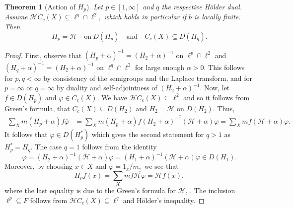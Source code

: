 \documentclass[10pt]{amsart}
\newtheorem{theorem}{Theorem}[section]
\theoremstyle{definition}
\newtheorem*{remark}{Remark}
\newcommand{\eat}[1]{}
\begin{document}
\begin{theorem}[Action of $ H_p$]\label{actionHp}
Let $p\in [1,\infty]$ and $q$ the respective H\"older dual. Assume $\mathcal{H} C_c(X)\subseteq\ell^q\cap\ell^2,$ which holds in particular if $b$ is locally finite.  Then \[ H_p =   \mathcal{H}\quad\text{on}~ D( H_p)\quad\text{and}\quad C_c(X)\subseteq D(H_q).\]
\end{theorem}
\begin{proof}
    First, observe that $(H_p+\alpha)^{-1} = (H_2+\alpha)^{-1}$ on $\ell^p\cap\ell^2$ and  $(H_q+\alpha)^{-1} = (H_2+\alpha)^{-1}$ on $\ell^q\cap\ell^2$ for large enough $\alpha>0.$ This follows for $p,q<\infty$ by consistency of the semigroups and the Laplace transform, \cite[Theorem 1.10]{EngelNagelShort} and for $p=\infty$ or $q = \infty $ by duality and self-adjointness of $(H_2+\alpha)^{-1}$. Now, let $f\in D(H_p)$ and $\varphi\in C_c(X).$ 
    We have $\mathcal{H}C_c(X)\subseteq \ell^2$ and so it follows from Green's formula, \cite[Lemma 2.1]{GKS} that $C_c(X)\subseteq D(H_2)$ and $ H_2 = \mathcal{H}$ on $D(H_2).$ Thus,
\begin{align*}
     \sum_ X m(H_p+\alpha)f\overline{\varphi} &= \sum_ X m (H_p+\alpha)f\overline{( H_2+\alpha)^{-1}(\mathcal{H}+\alpha)\varphi}
    = \sum_ X m f\overline{(\mathcal{H}+\alpha)\varphi} .
\end{align*}
 It follows that $\varphi\in D(H_p^*)$ which gives the second statement for $q>1$ as $H_p^* = H_q$. The case $q = 1$ follows from the identity \[\varphi = (H_2+\alpha)^{-1}(\mathcal{H}+\alpha)\varphi = (H_1+\alpha)^{-1}(\mathcal{H}+\alpha)\varphi\in D(H_1).\]
Moreover, by choosing $x\in X$ and $\varphi = 1_x\slash m,$ we see that \[H_pf(x) = \sum_ X mf\overline{\mathcal{H}\varphi} = \mathcal{H} f(x),\]
 where the last equality is due to the Green's formula for $\mathcal H$, \cite[Lemma~2.1]{GKS}. The inclusion $\ell^p\subseteq F$ follows from $\mathcal{H}C_c(X)\subseteq \ell^q$ and Hölder's inequality.
\end{proof}


\eat{
\begin{remark}
We mention that Theorem \ref{actionHp} applies to Laplacians $\Delta^\pm$, $\Delta^H$ on simplicial complexes (see Section \ref{s:weighted}) as well. In fact, in \cite{BK} it was shown that those Laplacians on $\ell^2$ act like Schrödinger operators $\mathcal{H},$ which in turn act as compositions of boundary and coboundary operators $\partial$ and $\delta.$ Theorem \ref{actionHp} then tells us that this is true for the $\ell^p$-generator as well for all $p\in[1,\infty].$


\end{remark}}
\end{document}
